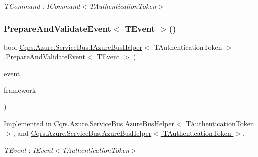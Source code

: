 \begin{Desc}
\item[Type Constraints]\begin{description}
\item[{\em T\+Command} : {\em I\+Command$<$T\+Authentication\+Token$>$}]\end{description}
\end{Desc}
\mbox{\label{interfaceCqrs_1_1Azure_1_1ServiceBus_1_1IAzureBusHelper_ac5cbeb6e8bbdb1a98501f0b746c12abd}} 
\subsubsection{\texorpdfstring{Prepare\+And\+Validate\+Event$<$ T\+Event $>$()}{PrepareAndValidateEvent< TEvent >()}}
{\footnotesize\ttfamily bool \hyperlink{interfaceCqrs_1_1Azure_1_1ServiceBus_1_1IAzureBusHelper}{Cqrs.\+Azure.\+Service\+Bus.\+I\+Azure\+Bus\+Helper}$<$ T\+Authentication\+Token $>$.Prepare\+And\+Validate\+Event$<$ T\+Event $>$ (\begin{DoxyParamCaption}\item[{T\+Event @}]{event,  }\item[{string}]{framework }\end{DoxyParamCaption})}



Implemented in \hyperlink{classCqrs_1_1Azure_1_1ServiceBus_1_1AzureBusHelper_ab0f6ff2ee04ad3b58e6713caebd3b560}{Cqrs.\+Azure.\+Service\+Bus.\+Azure\+Bus\+Helper$<$ T\+Authentication\+Token $>$}, and \hyperlink{classCqrs_1_1Azure_1_1ServiceBus_1_1AzureBusHelper_ab0f6ff2ee04ad3b58e6713caebd3b560}{Cqrs.\+Azure.\+Service\+Bus.\+Azure\+Bus\+Helper$<$ T\+Authentication\+Token $>$}.

\begin{Desc}
\item[Type Constraints]\begin{description}
\item[{\em T\+Event} : {\em I\+Event$<$T\+Authentication\+Token$>$}]\end{description}
\end{Desc}
\mbox{\label{interfaceCqrs_1_1Azure_1_1ServiceBus_1_1IAzureBusHelper_ad25c4130a4357504cfccba49999493c7}} 
